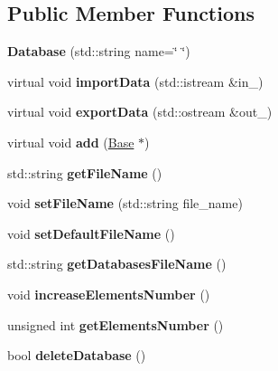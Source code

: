 \subsection*{Public Member Functions}
\begin{DoxyCompactItemize}
\item 
\mbox{\label{class_database_ad2ed7fa7af20809f84b7b13cd55ac9ef}} 
{\bfseries Database} (std\+::string name=\char`\"{} \char`\"{})
\item 
\mbox{\label{class_database_aab7af7898890481802ae8c62b745bbe9}} 
virtual void {\bfseries import\+Data} (std\+::istream \&in\+\_\+)
\item 
\mbox{\label{class_database_a79ff4cee1ef72bb7be0077c3553bd1e9}} 
virtual void {\bfseries export\+Data} (std\+::ostream \&out\+\_\+)
\item 
\mbox{\label{class_database_a68de399557003ffde43f6556237ee7f2}} 
virtual void {\bfseries add} (\mbox{\hyperlink{class_base}{Base}} $\ast$)
\item 
\mbox{\label{class_database_af757aa5b00ad981c6d3d2c9100694b0d}} 
std\+::string {\bfseries get\+File\+Name} ()
\item 
\mbox{\label{class_database_a84fe6d325d05ff32c513fd2763d69e57}} 
void {\bfseries set\+File\+Name} (std\+::string file\+\_\+name)
\item 
\mbox{\label{class_database_a60f291231bd1bf8e7bc40a06d44b5d81}} 
void {\bfseries set\+Default\+File\+Name} ()
\item 
\mbox{\label{class_database_ade24eccecba190ccd540b2bb2527d2d5}} 
std\+::string {\bfseries get\+Databases\+File\+Name} ()
\item 
\mbox{\label{class_database_aea49c371662e5a5c80c5af44314fd7e8}} 
void {\bfseries increase\+Elements\+Number} ()
\item 
\mbox{\label{class_database_aae945bd22e9b28da21cba4483d7d38ba}} 
unsigned int {\bfseries get\+Elements\+Number} ()
\item 
\mbox{\label{class_database_a254f1f7b0721de43ea3e203009741305}} 
bool {\bfseries delete\+Database} ()
\end{DoxyCompactItemize}
